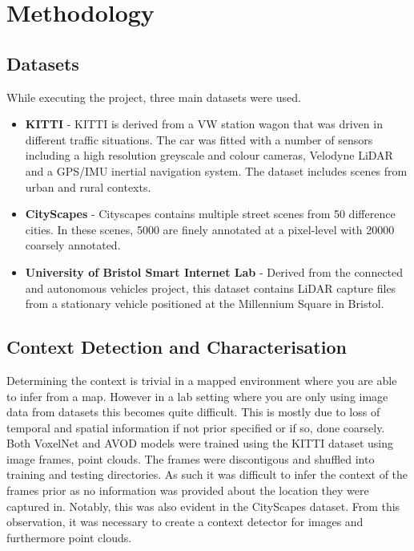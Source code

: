 \let\textcircled=\pgftextcircled


\chapter{Methodology}
\label{chap:methodology}


\section{Datasets}
	
While executing the project, three main datasets were used. 
	\begin{itemize}
		\item \textbf{KITTI }- KITTI is derived from a  VW station wagon that was driven in different traffic situations. The car was fitted with a number of sensors including a high resolution greyscale and colour cameras, Velodyne LiDAR and a GPS/IMU inertial navigation system. The dataset includes scenes from urban and rural contexts. 
		\item \textbf{CityScapes} -  Cityscapes contains multiple street scenes from 50 difference cities. In these scenes, 5000 are finely annotated at a pixel-level with 20000 coarsely annotated. 
	
		\item \textbf{University of Bristol Smart Internet Lab} - Derived from the connected and autonomous vehicles project, this dataset contains LiDAR capture files from a stationary vehicle positioned at the Millennium Square in Bristol. 
	\end{itemize}


\section{ Context Detection and Characterisation}

Determining the context is trivial in a mapped environment where you are able to infer from a map. However in a lab setting where you are only using image data from datasets this becomes quite difficult. This is mostly due to loss of temporal and spatial information if not prior specified or if so, done coarsely. Both VoxelNet and AVOD models were trained using the KITTI dataset using image frames, point clouds. The frames were discontigous and shuffled into training and testing directories. As such it was difficult to infer the context of the frames prior as no information was provided about the location they were captured in. Notably, this was also evident in the CityScapes dataset. From this observation, it was necessary to create a context detector for images and furthermore point clouds. 

